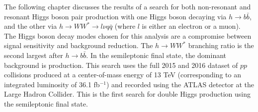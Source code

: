 The following chapter discusses the results of a search for both non-resonant and resonant Higgs boson pair production with one Higgs boson decaying via $h \to b \bar{b}$, and the other via $h \to WW^{\ast} \to l\nu q\bar{q}$ (where $l$ is either an electron or a muon). The Higgs boson decay modes chosen for this analysis are a compromise between signal sensitivity and background reduction. The $h \to WW^{\ast}$ branching ratio is the second largest after $h \to b \bar{b}$. In the semileptonic \bbWW final state, the dominant background is \ttbar production. This search uses the full 2015 and 2016 dataset of $pp$ collisions produced at a center-of-mass energy of 13 TeV (corresponding to an integrated luminosity of 36.1 fb$^{-1}$) and recorded using the ATLAS detector at the Large Hadron Collider. This is the first search for double Higgs production using the semileptonic \bbWW final state.


